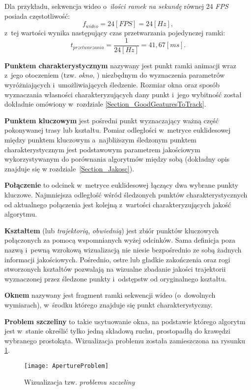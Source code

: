    Dla przykładu, sekwencja wideo o~\textit{ilości ramek na sekundę} równej 24 \textit{FPS} posiada częstotliwość: \[ f_{wideo} = 24 [FPS] = 24 [Hz], \] z~tej wartości wynika następujący czas przetwarzania pojedynczej ramki: \[ t_{przetwarzania} = \frac{1}{24 [Hz]} = 41,67 [ms]. \]

    \textbf{Punktem charakterystycznym} nazywany jest punkt ramki animacji wraz z~jego otoczeniem (tzw. \textit{okno}, \cite{SalientPointsTracking05}) niezbędnym do wyznaczenia parametrów wyróżniających i~umożliwiających śledzenie. Rozmiar okna oraz sposób wyznaczania własności charakteryzujących dany punkt i~jego wybitność został dokładnie omówiony w~rozdziale \ref{Section_GoodGeaturesToTrack}.

    \textbf{Punktem kluczowym} jest pośredni punkt wyznaczający ważną część pokonywanej trasy lub kształtu. Pomiar odległości w~metryce euklidesowej między punktem kluczowym a~najbliższym śledzonym punktem charakterystycznym jest podstawowym parametrem jakościowym wykorzystywanym do porównania algorytmów między sobą (dokładny opis znajduje się w rozdziale~\ref{Section_Jakosc}).

    \textbf{Połączenie} to odcinek w~metryce euklidesowej łączący dwa wybrane punkty kluczowe. Najmniejsza odległość wśród śledzonych punktów charakterystycznych od aktualnego połączenia jest kolejną z~wartości charakteryzujących jakość algorytmu.

    \textbf{Kształtem} (lub \textit{trajektorią}, \textit{obwiednią}) jest zbiór punktów kluczowych połączonych za pomocą wspomnianych wyżej odcinków. Sama definicja poza nazwą i~pewną wzrokową wizualizacją nie niesie bezpośrednio ze sobą żadnych informacji jakościowych. Pośrednio, ostre lub gładkie zakończenia oraz rogi stworzonych kształtów pozwalają na wizualne zbadanie jakości trajektorii wyznaczonej przez śledzone punkty i~odstępstw od oryginalnego kształtu.

    \textbf{Oknem} nazywany jest fragment ramki sekwencji wideo (o~dowolnych wymiarach), w~środku którego znajduje się punkt charakterystyczny.

    \textbf{Problem szczeliny} to takie usytuowanie okna, na podstawie którego algorytm jest w~stanie określić tylko jedną składową ruchu, prostopadłą do krawędzi wybranego prostokąta. Wizualizacja problemu została zamieszczona na rysunku \ref{fig:ApertureProblem}.

    \begin{figure}[!ht]
      \centering
      \texttt{[image: ApertureProblem]}
      \caption[Wizualizacja tzw. problemu szczeliny]{Wizualizacja tzw. \textit{problemu szczeliny}}
      \label{fig:ApertureProblem}
    \end{figure}

